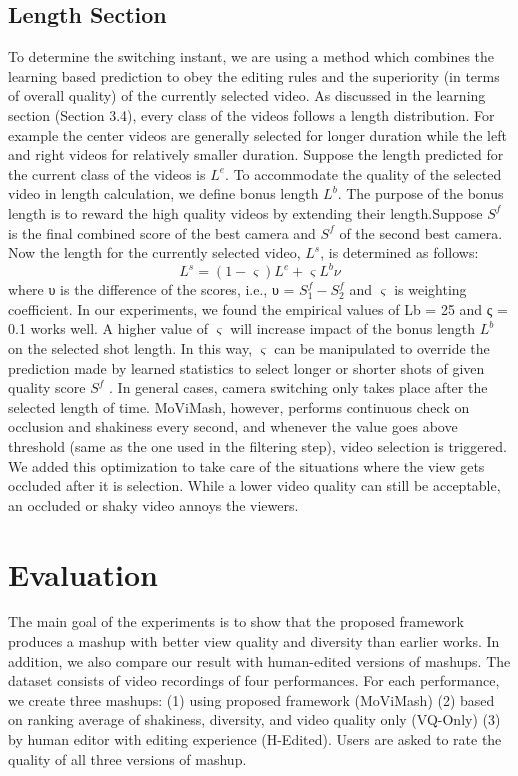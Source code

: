 \documentclass{sig-alternate}
\begin{document}
\subsection{Length Section}
To determine the switching instant, we are using a method which combines the learning based prediction to obey the editing rules and the superiority (in terms of overall quality) of the currently selected video. As discussed in the learning section (Section 3.4), every class of the videos follows a length distribution. For example the center videos are generally selected for longer duration while the left and right videos for relatively smaller duration. Suppose the length predicted for the current class of the videos is $L^e$. To accommodate the quality of the selected video in length calculation, we define bonus length $L^b$. The purpose of the bonus
length is to reward the high quality videos by extending their length.Suppose $S^f$ is the final combined score of the best camera and $S^f$ of the second best camera. Now the length for the currently selected video, $L^s$, is determined as follows:
\[
L^s = (1-\varsigma)L^e + \varsigma L^b\nu
\]
where υ is the difference of the scores, i.e., υ = $S_1^f-S_2^f$  and $\varsigma$ is weighting coefficient. In our experiments, we found the empirical values of Lb = 25 and ς = 0.1 works well. A higher value of $\varsigma$ will increase impact of the bonus length $L^b$ on the selected shot length. In this way, $\varsigma$ can be manipulated to override the prediction made by learned statistics to select longer or shorter shots of given quality score $S^f$ .
In general cases, camera switching only takes place after the selected length of time. MoViMash, however, performs continuous check on occlusion and shakiness every second, and whenever the
value goes above threshold (same as the one used in the filtering step), video selection is triggered. We added this optimization to take care of the situations where the view gets occluded after it is selection. While a lower video quality can still be acceptable, an occluded or shaky video annoys the viewers.

\section{Evaluation}
The main goal of the experiments is to show that the proposed framework produces a mashup with better view quality and diversity than earlier works. In addition, we also compare our result with human-edited versions of mashups. The dataset consists of video recordings of four performances. For each performance, we create three mashups: (1) using proposed framework (MoViMash) (2) based on ranking average of shakiness, diversity, and video quality only (VQ-Only) (3) by human editor with editing experience (H-Edited). Users are asked to rate the quality of all three versions of mashup.
\end{document}
